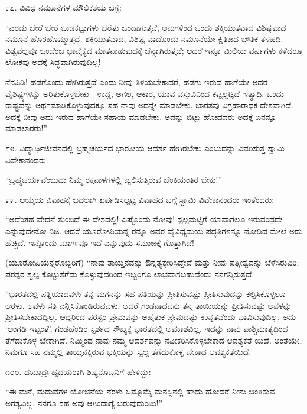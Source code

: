 ೯೭. ವಿವಿಧ ನಮೂನೆಗಳ ಮೌಲಿಕತೆಯ ಬಗ್ಗೆ:

“ಎರಡು ಬೇರೆ ಬೇರೆ ಬುಡಕಟ್ಟುಗಳು ಬೆರೆತು ಒಂದಾಗುತ್ತವೆ, ಅವುಗಳಿಂದ ಒಂದು ಶಕ್ತಿಯುತವಾದ ವಿಶಿಷ್ಟವಾದ ನಮೂನೆ ಹೊರಹೊಮ್ಮುತ್ತದೆ. ಶಕ್ತಿಯುತವಾದ, ವಿಶಿಷ್ಟ ವಾದೊಂದು ನಮೂನೆಯೇ ಕ್ಷಿತಿಜದ ಭೌತಿಕ ತಳಹದಿ. ವಿಶ್ವವೆಲ್ಲವೂ ಒಂದೆಂಬ ಭಾವೈಕ್ಯದ ಮಾತನಾಡುವುದಕ್ಕೆ ಚೆನ್ನಾಗಿರುತ್ತದೆ; ಆದರೆ ಇನ್ನೂ ಮಿಲಿಯ ವರ್ಷಗಳು ಕಳೆದರೂ ಲೋಕವು ಅದಕ್ಕೆ ಸಿದ್ಧವಾಗಿರುವುದಿಲ್ಲ!

ನೆನಪಿಡಿ! ಹಡಗೊಂದು ಹೇಗಿರುತ್ತದೆ ಎಂದು ನೀವು ತಿಳಿಯಬೇಕಾದರೆ, ಹಡಗು ಇರುವ ಹಾಗೆಯೇ ಅದರ ವೈಶಿಷ್ಟ್ಯಗಳನ್ನು ಅರಿತುಕೊಳ್ಳಬೇಕು - ಉದ್ದ, ಅಗಲ, ಆಕಾರ, ಯಾವ ವಸ್ತುವಿನಿಂದ ಕಟ್ಟಲ್ಪಟ್ಟಿದೆ ಇತ್ಯಾದಿ. ಒಂದು ರಾಷ್ಟ್ರವನ್ನು ಅರ್ಥಮಾಡಿಕೊಳ್ಳುವುದಕ್ಕೂ ಸಹ ನಾವು ಅದನ್ನೇ ಮಾಡಬೇಕು. ಭಾರತವು ವಿಗ್ರಹಾರಾಧಕ ದೇಶವಾಗಿದೆ. ಅದಕ್ಕೆ ನೀವು ಅದು ಇರುವ ಹಾಗೆಯೇ ಸಹಾಯ ಮಾಡಬೇಕು. ಅದನ್ನು ಬಿಟ್ಟು ಹೋದವರು ಅದಕ್ಕೆ ಏನನ್ನೂ ಮಾಡಲಾರರು!” 

೯೮. ವಿದ್ಯಾರ್ಥಿಜೀವನದಲ್ಲಿ ಬ್ರಹ್ಮಚರ್ಯದ ಭಾರತೀಯ ಆದರ್ಶ ಹೇಗಿರಬೇಕು ಎಂಬುದನ್ನು ವಿವರಿಸುತ್ತ ಸ್ವಾಮಿ ವಿವೇಕಾನಂದರು:

“ಬ್ರಹ್ಮಚರ್ಯವೆಂಬುದು ನಿಮ್ಮ ರಕ್ತನಾಳಗಳಲ್ಲಿ ಜ್ವಲಿಸುತ್ತಿರುವ ಬೆಂಕಿಯಂತಿರ ಬೇಕು!” 

೯೯. ಆಯ್ಕೆಯ ವಿವಾಹಕ್ಕೆ ಬದಲಾಗಿ ಏರ್ಪಡಿಸಲ್ಪಟ್ಟ ವಿವಾಹದ ಬಗ್ಗೆ ಸ್ವಾಮಿ ವಿವೇಕಾನಂದರು ಇಂತೆಂದರು:

“ಅದೆಂತಹ ವೇದನೆ ತುಂಬಿದೆ ಈ ದೇಶದಲ್ಲಿ! ಎಷ್ಟೊಂದು ನೋವು! ಸ್ಪಲ್ಪಮಟ್ಟಿಗೆ ಯಾವಾಗಲೂ ಇರುವಂಥದೇ ಎನ್ನುವುದೇನೋ ನಿಜ. ಆದರೆ ಯೂರೋಪಿಯನ್ನ ರನ್ನೂ ಅವರ ವೈವಿಧ್ಯಮಯ ಪದ್ಧತಿಗಳನ್ನೂ ನೋಡಿದ ಮೇಲೆ ಅದು ಹೆಚ್ಚಿದೆ. ಇನ್ನೊಂದು ಮಾರ್ಗವೂ ಇದೆ ಎನ್ನುವುದು ಸಮಾಜಕ್ಕೆ ಗೊತ್ತಾಗಿದೆ!

(ಯೂರೋಪಿಯನ್ನರೊಬ್ಬರಿಗೆ) “ನಾವು ತಾಯ್ತನವನ್ನು ಔನ್ನತ್ಯಕ್ಕೇರಿಸಿದ್ದೇವೆ ಮತ್ತು ನೀವು ಪತ್ನೀತ್ವವನ್ನು ಬೆಳೆಸಿರುವಿರಿ; ಪರಸ್ಪರ ಸ್ವಲ್ಪ ಕೊಟ್ಟುತೆಗೆದು ಕೊಳ್ಳುವುದರಿಂದ ಇಬ್ಬರಿಗೂ ಲಾಭವಾಗಬಹುದೆಂದು ನನಗನ್ನಿಸುತ್ತದೆ.

“ಭಾರತದಲ್ಲಿ ಪತ್ನಿಯಾದವಳು ತನ್ನ ಮಗನನ್ನು ಸಹ ಪತಿಯನ್ನು ಪ್ರೀತಿಸುವಷ್ಟು ಪ್ರೀತಿಸುವುದನ್ನು ಕಲ್ಪಿಸಿಕೊಳ್ಳಲೂ ಆರಳು. ಅವಳು ಸತಿ ಎನ್ನಿಸಿಕೊಂಡಿರುವವಳು. ಆದರೆ ಗಂಡನಾದವನು ತನ್ನ ತಾಯಿಯನ್ನು ಪ್ರೀತಿಸುವಷ್ಟು ಅವಳನ್ನು ಪ್ರೀತಿಸಬೇಕಾದದ್ದಿಲ್ಲ. ಆದ್ದರಿಂದ ಪರಸ್ಪರ ಪ್ರೇಮವನ್ನು ಅಹೈತುಕ ಪ್ರೇಮದಷ್ಟು ಉನ್ನತವೆಂದು ಭಾವಿಸುವುದಿಲ್ಲ. ಅದು ‘ಅಂಗಡಿ ಇಟ್ಟಂತೆ’. ಗಂಡಹೆಂಡಿರ ಸ್ಪರ್ಶದ ಸೌಖ್ಯಕ್ಕೆ ಭಾರತದಲ್ಲಿ ಅವಕಾಶವಿಲ್ಲ. ಇದನ್ನು ನಾವು ಪಾಶ್ಚಿಮಾತ್ಯದಿಂದ ತೆಗೆದುಕೊಳ್ಳ ಬೇಕಾಗಿದೆ. ನಿಮ್ಮಿಂದ ನಾವು ನಮ್ಮ ಆದರ್ಶವನ್ನು ನವೀಕರಿಸಿಕೊಳ್ಳಬೇಕಾದ ಆವಶ್ಯಕತೆ ಯಿದೆ. ಅಂತೆಯೇ, ನಿಮಗೂ ಸಹ ನಮ್ಮಲ್ಲಿ ತಾಯ್ತನಕ್ಕಿರುವ ಭಕ್ತಿಯನ್ನು ಸ್ವಲ್ಪ ತೆಗೆದುಕೊಳ್ಳ ಬೇಕಾದ ಆವಶ್ಯಕತೆಯಿದೆ. 

೧೦೦. ದಯಾರ್ದ್ರಹೃದಯರಾಗಿ ಶಿಷ್ಯನೊಬ್ಬನಿಗೆ ಹೇಳಿದ್ದು:

“ಈ ಮನೆ, ಮದುವೆಗಳ ಯೋಚನೆಯ ನೆರಳು ಒಮ್ಮೊಮ್ಮೆ ಮನಸ್ಸಿನಲ್ಲಿ ಹಾದು ಹೋದರೆ ನೀನು ಚಿಂತಿಸುವ ಅಗತ್ಯವಿಲ್ಲ. ನನಗೂ ಸಹ ಅವು ಆಗಿಂದಾಗ್ಯೆ ಬರುವುದುಂಟು!” 

